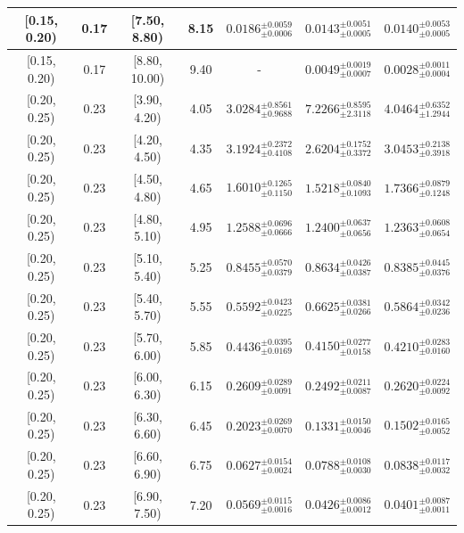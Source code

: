 \begin{longtable}{|c|c|c|c|c|c|c|}
\hline
[0.15, 0.20) & 0.17 & [7.50, 8.80) & 8.15 & $0.0186^{ \pm 0.0059 }_{ \pm 0.0006 }$ & $0.0143^{ \pm 0.0051 }_{ \pm 0.0005 }$ & $0.0140^{ \pm 0.0053 }_{ \pm 0.0005 }$ \\ 
\hline
[0.15, 0.20) & 0.17 & [8.80, 10.00) & 9.40 & - & $0.0049^{ \pm 0.0019 }_{ \pm 0.0007 }$ & $0.0028^{ \pm 0.0011 }_{ \pm 0.0004 }$ \\ 
\hline
[0.20, 0.25) & 0.23 & [3.90, 4.20) & 4.05 & $3.0284^{ \pm 0.8561 }_{ \pm 0.9688 }$ & $7.2266^{ \pm 0.8595 }_{ \pm 2.3118 }$ & $4.0464^{ \pm 0.6352 }_{ \pm 1.2944 }$ \\ 
\hline
[0.20, 0.25) & 0.23 & [4.20, 4.50) & 4.35 & $3.1924^{ \pm 0.2372 }_{ \pm 0.4108 }$ & $2.6204^{ \pm 0.1752 }_{ \pm 0.3372 }$ & $3.0453^{ \pm 0.2138 }_{ \pm 0.3918 }$ \\ 
\hline
[0.20, 0.25) & 0.23 & [4.50, 4.80) & 4.65 & $1.6010^{ \pm 0.1265 }_{ \pm 0.1150 }$ & $1.5218^{ \pm 0.0840 }_{ \pm 0.1093 }$ & $1.7366^{ \pm 0.0879 }_{ \pm 0.1248 }$ \\ 
\hline
[0.20, 0.25) & 0.23 & [4.80, 5.10) & 4.95 & $1.2588^{ \pm 0.0696 }_{ \pm 0.0666 }$ & $1.2400^{ \pm 0.0637 }_{ \pm 0.0656 }$ & $1.2363^{ \pm 0.0608 }_{ \pm 0.0654 }$ \\ 
\hline
[0.20, 0.25) & 0.23 & [5.10, 5.40) & 5.25 & $0.8455^{ \pm 0.0570 }_{ \pm 0.0379 }$ & $0.8634^{ \pm 0.0426 }_{ \pm 0.0387 }$ & $0.8385^{ \pm 0.0445 }_{ \pm 0.0376 }$ \\ 
\hline
[0.20, 0.25) & 0.23 & [5.40, 5.70) & 5.55 & $0.5592^{ \pm 0.0423 }_{ \pm 0.0225 }$ & $0.6625^{ \pm 0.0381 }_{ \pm 0.0266 }$ & $0.5864^{ \pm 0.0342 }_{ \pm 0.0236 }$ \\ 
\hline
[0.20, 0.25) & 0.23 & [5.70, 6.00) & 5.85 & $0.4436^{ \pm 0.0395 }_{ \pm 0.0169 }$ & $0.4150^{ \pm 0.0277 }_{ \pm 0.0158 }$ & $0.4210^{ \pm 0.0283 }_{ \pm 0.0160 }$ \\ 
\hline
[0.20, 0.25) & 0.23 & [6.00, 6.30) & 6.15 & $0.2609^{ \pm 0.0289 }_{ \pm 0.0091 }$ & $0.2492^{ \pm 0.0211 }_{ \pm 0.0087 }$ & $0.2620^{ \pm 0.0224 }_{ \pm 0.0092 }$ \\ 
\hline
[0.20, 0.25) & 0.23 & [6.30, 6.60) & 6.45 & $0.2023^{ \pm 0.0269 }_{ \pm 0.0070 }$ & $0.1331^{ \pm 0.0150 }_{ \pm 0.0046 }$ & $0.1502^{ \pm 0.0165 }_{ \pm 0.0052 }$ \\ 
\hline
[0.20, 0.25) & 0.23 & [6.60, 6.90) & 6.75 & $0.0627^{ \pm 0.0154 }_{ \pm 0.0024 }$ & $0.0788^{ \pm 0.0108 }_{ \pm 0.0030 }$ & $0.0838^{ \pm 0.0117 }_{ \pm 0.0032 }$ \\ 
\hline
[0.20, 0.25) & 0.23 & [6.90, 7.50) & 7.20 & $0.0569^{ \pm 0.0115 }_{ \pm 0.0016 }$ & $0.0426^{ \pm 0.0086 }_{ \pm 0.0012 }$ & $0.0401^{ \pm 0.0087 }_{ \pm 0.0011 }$ \\ 

\end{longtable}

